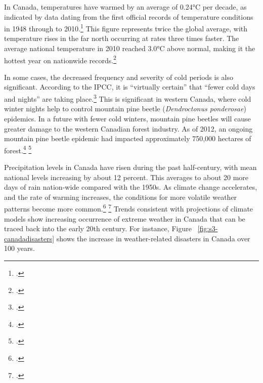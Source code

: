 In Canada, temperatures have warmed by an average of 0.24°C per decade, as indicated by data dating from the first official records of temperature conditions in 1948 through to 2010.\footcite[][p. 13]{TellingWeatherStory}
This figure represents twice the global average, with temperature rises in the far north occurring at rates three times faster. 
The average national temperature in 2010 reached 3.0°C above normal, making it the hottest year on nationwide records.\footcite[][p. 13]{TellingWeatherStory}



In some cases, the decreased frequency and severity of cold periods is also significant.
According to the IPCC, it is ``virtually certain'' that ``fewer cold days and nights'' are taking place.\footcite[][p. 53]{IPCCar4_syr}
This is significant in western Canada, where cold winter nights help to control mountain pine beetle (\emph{Dendroctonus ponderosae}) epidemics.
In a future with fewer cold winters, mountain pine beetles will cause greater damage to the western Canadian forest industry.
As of 2012, an ongoing mountain pine beetle epidemic had impacted approximately 750,000 hectares of forest.\footcite[][]{Chapman2012} \footcite[][]{BeetleEpidemic}



Precipitation levels in Canada have risen during the past half-century, with mean national levels increasing by about 12 percent. 
This averages to about 20 more days of rain nation-wide compared with the 1950s. 
As climate change accelerates, and the rate of warming increases, the conditions for more volatile weather patterns become more common.\footcite[Research published in \emph{Nature Geoscience} notes: ``Precipitation extremes increase in intensity over many regions of the globe in simulations of a warming climate''][]{OGorman2012} \footcite[][]{ExtremeTropical2012}
Trends consistent with projections of climate models show increasing occurrence of extreme weather in Canada that can be traced back into the early 20th century. 
For instance, Figure ~\ref{fig:s3-canadadisasters} shows the increase in weather-related disasters in Canada over 100 years.



